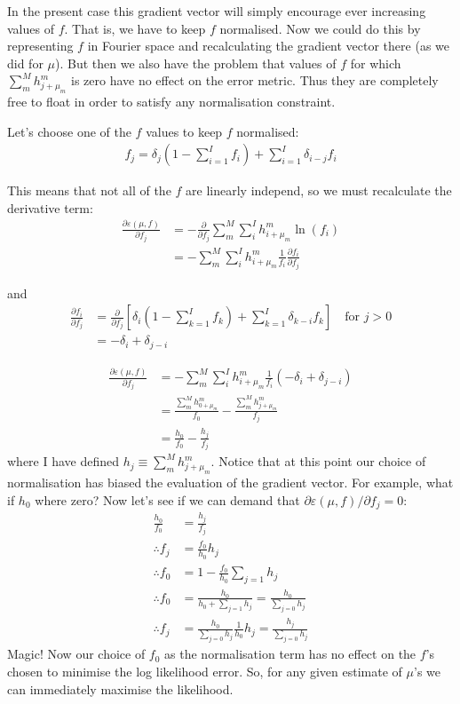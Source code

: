 \documentclass[11pt]{article}
\begin{document}
In the present case this gradient vector will simply encourage ever increasing values of $f$. That is, we have to keep $f$ normalised. Now we could do this by representing $f$ in Fourier space and recalculating the gradient vector there (as we did for $\mu$). But then we also have the problem that values of $f$ for which $\sum_m^M h^m_{j+\mu_m}$ is zero have no effect on the error metric. Thus they are completely free to float in order to satisfy any normalisation constraint.

Let's choose one of the $f$ values to keep $f$ normalised:
\begin{align}
   f_j = \delta_{j} (1 - \sum_{i=1}^I f_i) + \sum_{i=1}^I \delta_{i-j} f_i
\end{align}

This means that not all of the $f$ are linearly independ, so we must recalculate the derivative term:
\begin{align}
   \frac{\partial \varepsilon(\mu, f)}{\partial f_j} &= -\frac{\partial}{\partial f_j} \sum_m^M \sum_i^I h^m_{i+\mu_m} \ln(f_i) \\
   &= - \sum_m^M \sum_i^I h^m_{i+\mu_m} \frac{1}{f_i} \frac{\partial f_i}{\partial f_j}
\end{align}

and
\begin{align}
   \frac{\partial f_i}{\partial f_j} &= \frac{\partial }{\partial f_j} \left[ \delta_{i} (1 - \sum_{k=1}^I f_k) + \sum_{k=1}^I \delta_{k-i} f_k \right] \quad \text{for } j > 0 \\
   &= -\delta_{i} + \delta_{j-i}
\end{align}

\begin{align}
   \frac{\partial \varepsilon(\mu, f)}{\partial f_j} &=- \sum_m^M \sum_i^I h^m_{i+\mu_m} \frac{1}{f_i} (-\delta_{i} + \delta_{j-i}) \\
   &= \frac{ \sum_m^M h^m_{0+\mu_m}}{f_0} - \frac{ \sum_m^M h^m_{j+\mu_m}}{f_j} \\
   &= \frac{ h_{0}}{f_0} - \frac{ h_{j}}{f_j}
\end{align}
where I have defined $h_j \equiv \sum_m^M h^m_{j+\mu_m}$. Notice that at this point our choice of normalisation has biased the evaluation of the gradient vector. For example, what if $h_0$ where zero? Now let's see if we can demand that $\partial \varepsilon(\mu, f) / \partial f_j = 0$:
\begin{align}
   \frac{ h_{0}}{f_0} &= \frac{ h_{j}}{f_j} \\
   \therefore f_j &= \frac{f_0}{h_0} h_j \\
   \therefore f_0 &= 1 -  \frac{f_0}{h_0} \sum_{j=1} h_j \\
   \therefore f_0 &= \frac{h_0}{h_0 + \sum_{j=1} h_j} = \frac{h_0}{\sum_{j=0} h_j} \\
   \therefore f_j &= \frac{h_0}{\sum_{j=0} h_j} \frac{1}{h_0} h_j = \frac{h_j}{\sum_{j=0} h_j}
\end{align}
Magic! Now our choice of $f_0$ as the normalisation term has no effect on the $f$'s chosen to minimise the log likelihood error. So, for any given estimate of $\mu$'s we can immediately maximise the likelihood. 
\end{document}
